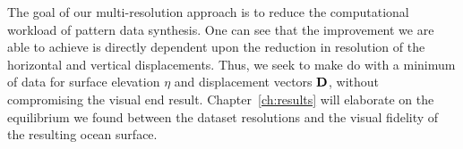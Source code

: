 The goal of our multi-resolution approach is to reduce the computational
workload of pattern data synthesis. One can see that the improvement we are
able to achieve is directly dependent upon the reduction in resolution
of the horizontal and vertical displacements. Thus, we seek to make do with
a minimum of data for surface elevation $\eta$ and displacement vectors
$\mathbf{D}$, without compromising the visual end result. Chapter~\ref{ch:results}
will elaborate on the equilibrium we found between the dataset resolutions and
the visual fidelity of the resulting ocean surface.
%




